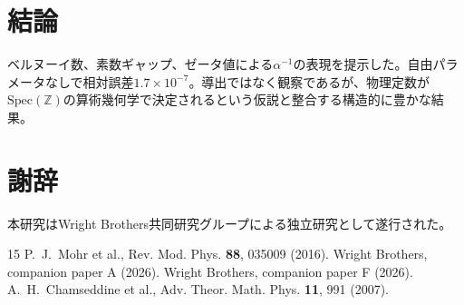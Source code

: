 \documentclass[11pt,a4paper]{article}
\newcommand{\Spec}{\mathrm{Spec}}
\begin{document}
\section{結論}

ベルヌーイ数、素数ギャップ、ゼータ値による$\alpha^{-1}$の表現を提示した。自由パラメータなしで相対誤差$1.7 \times 10^{-7}$。導出ではなく観察であるが、物理定数が$\Spec(\mathbb{Z})$の算術幾何学で決定されるという仮説と整合する構造的に豊かな結果。

\section*{謝辞}
本研究はWright Brothers共同研究グループによる独立研究として遂行された。

\begin{thebibliography}{15}
 P.~J.~Mohr et al., Rev. Mod. Phys. \textbf{88}, 035009 (2016).
 Wright Brothers, companion paper A (2026).
 Wright Brothers, companion paper F (2026).
 A.~H.~Chamseddine et al., Adv. Theor. Math. Phys. \textbf{11}, 991 (2007).
\end{thebibliography}
\end{document}
